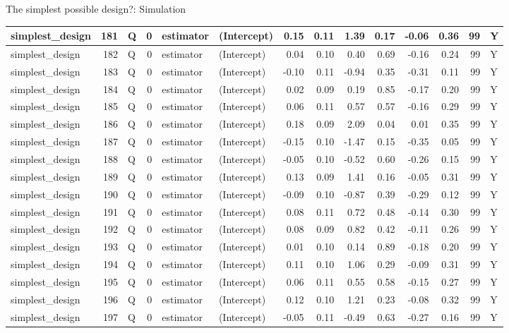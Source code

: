 \documentclass[
  11pt,
  ignorenonframetext,
]{beamer}
\begin{document}
\begin{frame}[fragile]{The simplest possible design?: Simulation}
\begin{tabular}{l|r|l|r|l|l|r|r|r|r|r|r|r|l}
\hline
simplest\_design & 181 & Q & 0 & estimator & (Intercept) & 0.15 & 0.11 & 1.39 & 0.17 & -0.06 & 0.36 & 99 & Y\\
\hline
simplest\_design & 182 & Q & 0 & estimator & (Intercept) & 0.04 & 0.10 & 0.40 & 0.69 & -0.16 & 0.24 & 99 & Y\\
\hline
simplest\_design & 183 & Q & 0 & estimator & (Intercept) & -0.10 & 0.11 & -0.94 & 0.35 & -0.31 & 0.11 & 99 & Y\\
\hline
simplest\_design & 184 & Q & 0 & estimator & (Intercept) & 0.02 & 0.09 & 0.19 & 0.85 & -0.17 & 0.20 & 99 & Y\\
\hline
simplest\_design & 185 & Q & 0 & estimator & (Intercept) & 0.06 & 0.11 & 0.57 & 0.57 & -0.16 & 0.29 & 99 & Y\\
\hline
simplest\_design & 186 & Q & 0 & estimator & (Intercept) & 0.18 & 0.09 & 2.09 & 0.04 & 0.01 & 0.35 & 99 & Y\\
\hline
simplest\_design & 187 & Q & 0 & estimator & (Intercept) & -0.15 & 0.10 & -1.47 & 0.15 & -0.35 & 0.05 & 99 & Y\\
\hline
simplest\_design & 188 & Q & 0 & estimator & (Intercept) & -0.05 & 0.10 & -0.52 & 0.60 & -0.26 & 0.15 & 99 & Y\\
\hline
simplest\_design & 189 & Q & 0 & estimator & (Intercept) & 0.13 & 0.09 & 1.41 & 0.16 & -0.05 & 0.31 & 99 & Y\\
\hline
simplest\_design & 190 & Q & 0 & estimator & (Intercept) & -0.09 & 0.10 & -0.87 & 0.39 & -0.29 & 0.12 & 99 & Y\\
\hline
simplest\_design & 191 & Q & 0 & estimator & (Intercept) & 0.08 & 0.11 & 0.72 & 0.48 & -0.14 & 0.30 & 99 & Y\\
\hline
simplest\_design & 192 & Q & 0 & estimator & (Intercept) & 0.08 & 0.09 & 0.82 & 0.42 & -0.11 & 0.26 & 99 & Y\\
\hline
simplest\_design & 193 & Q & 0 & estimator & (Intercept) & 0.01 & 0.10 & 0.14 & 0.89 & -0.18 & 0.20 & 99 & Y\\
\hline
simplest\_design & 194 & Q & 0 & estimator & (Intercept) & 0.11 & 0.10 & 1.06 & 0.29 & -0.09 & 0.31 & 99 & Y\\
\hline
simplest\_design & 195 & Q & 0 & estimator & (Intercept) & 0.06 & 0.11 & 0.55 & 0.58 & -0.15 & 0.27 & 99 & Y\\
\hline
simplest\_design & 196 & Q & 0 & estimator & (Intercept) & 0.12 & 0.10 & 1.21 & 0.23 & -0.08 & 0.32 & 99 & Y\\
\hline
simplest\_design & 197 & Q & 0 & estimator & (Intercept) & -0.05 & 0.11 & -0.49 & 0.63 & -0.27 & 0.16 & 99 & Y\\

\end{tabular}
\end{frame}
\end{document}
